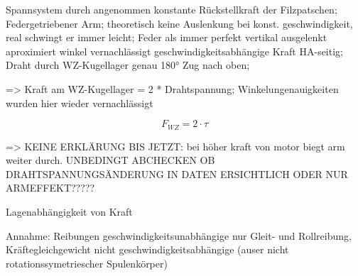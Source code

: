 Spannsystem durch angenommen konstante Rückstellkraft der Filzpatschen; Federgetriebener Arm; theoretisch keine Auslenkung bei konst. geschwindigkeit, real schwingt er immer leicht; Feder als immer perfekt vertikal ausgelenkt aproximiert winkel vernachlässigt geschwindigkeitsabhängige Kraft HA-seitig; Draht durch WZ-Kugellager genau 180° Zug nach oben;

=> Kraft am WZ-Kugellager = 2 * Drahtspannung; Winkelungenauigkeiten wurden hier wieder vernachlässigt

\begin{equation}
    \label{eq:wz_kraft}
    F_{WZ} = 2 \cdot \tau
\end{equation}

=> KEINE ERKLÄRUNG BIS JETZT: bei höher kraft von motor biegt arm weiter durch.
UNBEDINGT ABCHECKEN OB DRAHTSPANNUNGSÄNDERUNG IN DATEN ERSICHTLICH ODER NUR ARMEFFEKT?????


Lagenabhängigkeit von Kraft


Annahme: Reibungen geschwindigkeitsunabhängige nur Gleit- und Rollreibung, Kräftegleichgewicht nicht geschwindigkeitsabhängige (auser nicht rotationssymetriescher Spulenkörper)

